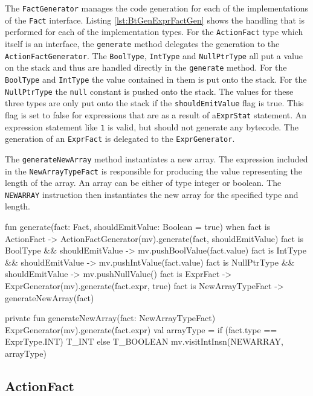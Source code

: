 The \verb|FactGenerator| manages the code generation for each of the implementations of the \verb|Fact| interface. Listing \ref{lst:BtGenExprFactGen} shows the handling that is performed for each of the implementation types. For the \verb|ActionFact| type which itself is an interface, the \verb|generate| method delegates the generation to the \verb|ActionFactGenerator|. The \verb|BoolType|, \verb|IntType| and \verb|NullPtrType| all put a value on the stack and thus are handled directly in the \verb|generate| method. For the \verb|BoolType| and \verb|IntType| the value contained in them is put onto the stack. For the \verb|NullPtrType| the \verb|null| constant is pushed onto the stack. The values for these three types are only put onto the stack if the \verb|shouldEmitValue| flag is true. This flag is set to false for expressions that are as a result of a\verb|ExprStat| statement. An expression statement like \verb|1| is valid, but should not generate any bytecode. The generation of an \verb|ExprFact| is delegated to the \verb|ExprGenerator|. 

The \verb|generateNewArray| method instantiates a new array. The expression included in the \verb|NewArrayTypeFact| is responsible for producing the value representing the length of the array. An array can be either of type integer or boolean. The \verb|NEWARRAY| instruction then instantiates the new array for the specified type and length.  

\begin{KotlinCode}[float,numbers=none,caption=Implementation of the \texttt{generate} method of the \texttt{FactGenerator}., label=lst:BtGenExprFactGen]
fun generate(fact: Fact, shouldEmitValue: Boolean = true) {
    when {
       fact is ActionFact -> ActionFactGenerator(mv).generate(fact, shouldEmitValue)
       fact is BoolType && shouldEmitValue -> mv.pushBoolValue(fact.value)
       fact is IntType && shouldEmitValue -> mv.pushIntValue(fact.value)
       fact is NullPtrType && shouldEmitValue -> mv.pushNullValue()
       fact is ExprFact -> ExprGenerator(mv).generate(fact.expr, true)
       fact is NewArrayTypeFact -> generateNewArray(fact)
    }
}

private fun generateNewArray(fact: NewArrayTypeFact) {
    ExprGenerator(mv).generate(fact.expr)
    val arrayType = if (fact.type == ExprType.INT) {
        T_INT
    } else {
        T_BOOLEAN
    }
    mv.visitIntInsn(NEWARRAY, arrayType)
}
\end{KotlinCode}

\subsection{ActionFact}

